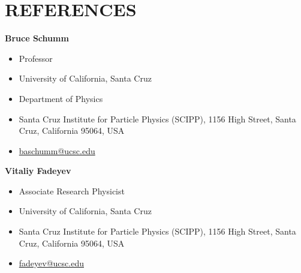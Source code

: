 \documentclass[paper=a4,fontsize=11pt]{scrartcl} %
\newcommand{\sepspace}{\vspace*{1em}}		%
\newcommand{\NewPart}[1]{\section*{\uppercase{#1}}}
\begin{document}



\NewPart{References}{}
    \textbf{Bruce Schumm}
    \begin{itemize}[itemsep=-5pt]
        \item[] Professor
        \item[] University of California, Santa Cruz
        \item[] Department of Physics
        \item[] Santa Cruz Institute for Particle Physics (SCIPP),
         1156 High Street, Santa Cruz, California 95064, USA
        \item[] \href{mailto:baschumm@ucsc.edu} {baschumm@ucsc.edu}
    \end{itemize}

    \sepspace

    \textbf{Vitaliy Fadeyev}
    \begin{itemize}[itemsep=-5pt]
        \item[] Associate Research Physicist
        \item[] University of California, Santa Cruz
        \item[] Santa Cruz Institute for Particle Physics (SCIPP),
         1156 High Street, Santa Cruz, California 95064, USA
        \item[] \href{mailto:fadeyev@ucsc.edu} {fadeyev@ucsc.edu}
    \end{itemize}
\end{document}
